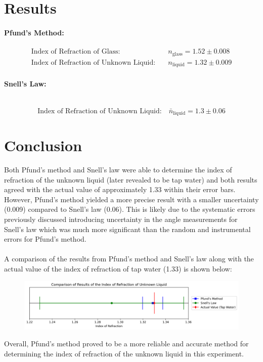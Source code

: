 \documentclass[12pt]{article}
\begin{document}
\section{Results}
\paragraph{Pfund's Method:} \mbox{}
\begin{align*}
\text{Index of Refraction of Glass:} \quad & n_{\text{glass}} = 1.52 \pm 0.008 \\
\text{Index of Refraction of Unknown Liquid:} \quad & n_{\text{liquid}} = 1.32 \pm 0.009
\end{align*}

\paragraph{Snell's Law:} \mbox{}\\
\[\text{Index of Refraction of Unknown Liquid:} \quad \bar{n}_{\text{liquid}} = 1.3 \pm 0.06\]

\section{Conclusion}
Both Pfund's method and Snell's law were able to determine the index of refraction of the unknown liquid (later revealed to be tap water) and both results agreed with the actual value of approximately 1.33 within their error bars. However, Pfund's method yielded a more precise result with a smaller uncertainty (0.009) compared to Snell's law (0.06). This is likely due to the systematic errors previously discussed introducing uncertainty in the angle measurements for Snell's law which was much more significant than the random and instrumental errors for Pfund's method. \\ \\
A comparison of the results from Pfund's method and Snell's law along with the actual value of the index of refraction of tap water (1.33) is shown below:
\begin{figure}[H]
    \centering
    \includegraphics[width=1\textwidth]{results.png}
\end{figure}
Overall, Pfund's method proved to be a more reliable and accurate method for determining the index of refraction of the unknown liquid in this experiment.
\end{document}
